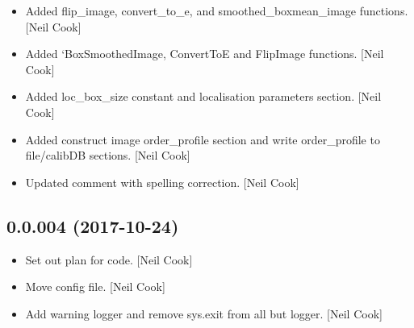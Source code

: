 \documentclass[a4paper,10pt,english]{report}
\begin{document}
\begin{itemize}
\item {} 
Added flip\_image, convert\_to\_e, and smoothed\_boxmean\_image functions.
{[}Neil Cook{]}

\item {} 
Added ‘BoxSmoothedImage, ConvertToE and FlipImage functions. {[}Neil
Cook{]}

\item {} 
Added loc\_box\_size constant and localisation parameters section. {[}Neil
Cook{]}

\item {} 
Added construct image order\_profile section and write order\_profile to
file/calibDB sections. {[}Neil Cook{]}

\item {} 
Updated comment with spelling correction. {[}Neil Cook{]}

\end{itemize}


\subsection{0.0.004 (2017-10-24)}
\label{\detokenize{misc/changelog:id545}}\begin{itemize}
\item {} 
Set out plan for code. {[}Neil Cook{]}

\item {} 
Move config file. {[}Neil Cook{]}

\item {} 
Add warning logger and remove sys.exit from all but logger. {[}Neil
Cook{]}

\end{itemize}
\end{document}
